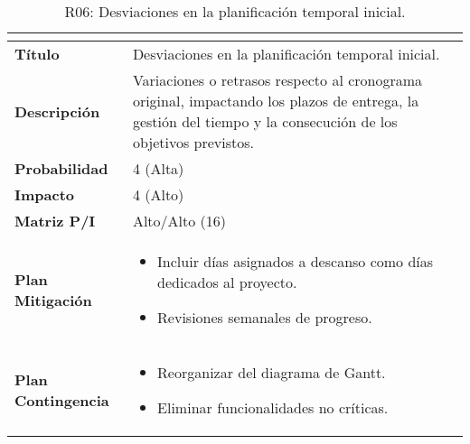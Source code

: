 \begin{table}[H]
\centering
\begin{tabular}{|>{\bfseries}l|p{10cm}|}
\hline
\rowcolor{lightgray}
\multicolumn{2}{|c|}{\textbf{Riesgo R06}} \\ \hline
Título & Desviaciones en la planificación temporal inicial. \\ \hline
Descripción & Variaciones o retrasos respecto al cronograma original, impactando los plazos de entrega, la gestión del tiempo y la consecución de los objetivos previstos. \\ \hline
Probabilidad & 4 (Alta) \\ \hline
Impacto & 4 (Alto) \\ \hline
Matriz P/I & Alto/Alto (16)\\ \hline
Plan Mitigación & 
\begin{itemize}
\item Incluir días asignados a descanso como días dedicados al proyecto.
\item Revisiones semanales de progreso.
\end{itemize} \\ \hline
Plan Contingencia & 
\begin{itemize}
\item Reorganizar del diagrama de Gantt.
\item Eliminar funcionalidades no críticas.
\end{itemize} \\ \hline
\end{tabular}
\caption{R06: Desviaciones en la planificación temporal inicial.}
\label{tab:R06}
\end{table}


